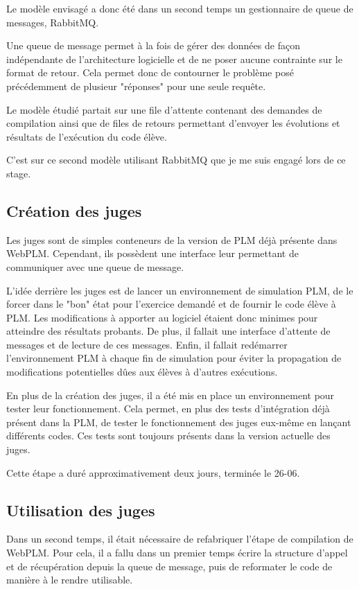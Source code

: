 \documentclass[stage]{tnreport}
\begin{document}
Le modèle envisagé a donc été dans un second temps un gestionnaire de queue de messages, RabbitMQ.

Une queue de message permet à la fois de gérer des données de façon indépendante de l'architecture logicielle et de ne poser aucune contrainte sur le format de retour. Cela permet donc de contourner le problème posé précédemment de plusieur "réponses" pour une seule requête.

Le modèle étudié partait sur une file d'attente contenant des demandes de compilation ainsi que de files de retours permettant d'envoyer les évolutions et résultats de l'exécution du code élève.

C'est sur ce second modèle utilisant RabbitMQ que je me suis engagé lors de ce stage.

\subsection{Création des juges}

Les juges sont de simples conteneurs de la version de PLM déjà présente dans WebPLM. Cependant, ils possèdent une interface leur permettant de communiquer avec une queue de message.

L'idée derrière les juges est de lancer un environnement de simulation PLM, de le forcer dans le "bon" état pour l'exercice demandé et de fournir le code élève à PLM. Les modifications à apporter au logiciel étaient donc minimes pour atteindre des résultats probants. De plus, il fallait une interface d'attente de messages et de lecture de ces messages. Enfin, il fallait redémarrer l'environnement PLM à chaque fin de simulation pour éviter la propagation de modifications potentielles dûes aux élèves à d'autres exécutions.

En plus de la création des juges, il a été mis en place un environnement pour tester leur fonctionnement. Cela permet, en plus des tests d'intégration déjà présent dans la PLM, de tester le fonctionnement des juges eux-même en lançant différents codes. Ces tests sont toujours présents dans la version actuelle des juges.

Cette étape a duré approximativement deux jours, terminée le 26-06.

\subsection{Utilisation des juges}

Dans un second temps, il était nécessaire de refabriquer l'étape de compilation de WebPLM. Pour cela, il a fallu dans un premier temps écrire la structure d'appel et de récupération depuis la queue de message, puis de reformater le code de manière à le rendre utilisable.
\end{document}

